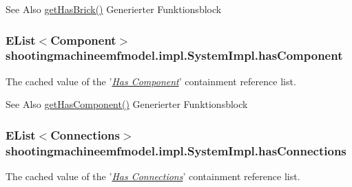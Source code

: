 \begin{DoxySeeAlso}{See Also}
\hyperlink{classshootingmachineemfmodel_1_1impl_1_1_system_impl_af311fd2939009d1106d5643403259d30}{get\-Has\-Brick()} Generierter Funktionsblock  
\end{DoxySeeAlso}
\hypertarget{classshootingmachineemfmodel_1_1impl_1_1_system_impl_a1105994c6e0988d96fe8121325eef277}{
\subsubsection[{has\-Component}]{\setlength{\rightskip}{0pt plus 5cm}E\-List$<${\bf Component}$>$ shootingmachineemfmodel.\-impl.\-System\-Impl.\-has\-Component\hspace{0.3cm}{\ttfamily [protected]}}}\label{classshootingmachineemfmodel_1_1impl_1_1_system_impl_a1105994c6e0988d96fe8121325eef277}
The cached value of the '\hyperlink{classshootingmachineemfmodel_1_1impl_1_1_system_impl_ae7f2544d43d2a53d5679ae3d511cffd4}{{\itshape Has Component}}' containment reference list.

\begin{DoxySeeAlso}{See Also}
\hyperlink{classshootingmachineemfmodel_1_1impl_1_1_system_impl_ae7f2544d43d2a53d5679ae3d511cffd4}{get\-Has\-Component()} Generierter Funktionsblock  
\end{DoxySeeAlso}
\hypertarget{classshootingmachineemfmodel_1_1impl_1_1_system_impl_a0cf68c4f9c477dd5a15cc061dea1454b}{
\subsubsection[{has\-Connections}]{\setlength{\rightskip}{0pt plus 5cm}E\-List$<${\bf Connections}$>$ shootingmachineemfmodel.\-impl.\-System\-Impl.\-has\-Connections\hspace{0.3cm}{\ttfamily [protected]}}}\label{classshootingmachineemfmodel_1_1impl_1_1_system_impl_a0cf68c4f9c477dd5a15cc061dea1454b}
The cached value of the '\hyperlink{classshootingmachineemfmodel_1_1impl_1_1_system_impl_a6573b6b1522a452bd631415525126000}{{\itshape Has Connections}}' containment reference list.

